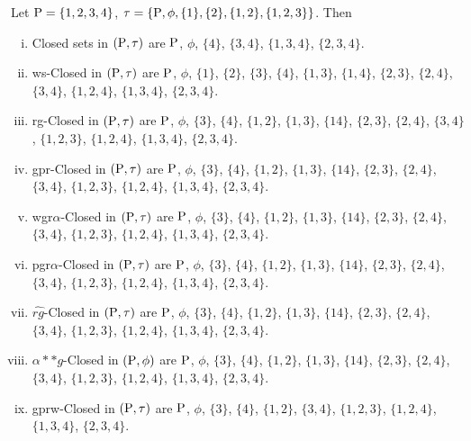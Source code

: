 \begin{exm}\label{exm2.1.7}
Let $\mathrm{P} = \{1, 2, 3, 4\}$, $\tau = \{\mathrm{P},\phi, \{1\}, \{2\}, \{1, 2\}, \{1, 2, 3\}\}$. Then 
\begin{enumerate}[(i)]
\item Closed sets in $(\mathrm{P}, \tau)$ are $\mathrm{P}$, $\phi$, $\{4\}$, $\{3, 4\}$, $\{1, 3, 4\}$, $\{2, 3, 4\}$.

\item ws-Closed in $(\mathrm{P}, \tau)$ are $\mathrm{P}$, $\phi$, $\{1\}$, $\{2\}$, $\{3\}$, $\{4\}$, $\{1, 3\}$, $\{1, 4\}$, $\{2, 3\}$, $\{2, 4\}$, $\{3, 4\}$, $\{1, 2, 4\}$, $\{1, 3, 4\}$, $\{2, 3, 4\}$.

\item rg-Closed in $(\mathrm{P}, \tau)$ are $\mathrm{P}$, $\phi$, $\{3\}$, $\{4\}$, $\{1, 2\}$, $\{1, 3\}$, $\{1 4\}$, $\{2, 3\}$, $\{2, 4\}$, $\{3, 4\}$, $\{1, 2, 3\}$, $\{1, 2, 4\}$, $\{1, 3, 4\}$, $\{2, 3, 4\}$.

\item gpr-Closed in $(\mathrm{P}, \tau)$ are $\mathrm{P}$, $\phi$, $\{3\}$, $\{4\}$, $\{1, 2\}$, $\{1, 3\}$, $\{1 4\}$, $\{2, 3\}$, $\{2, 4\}$, $\{3, 4\}$, $\{1, 2, 3\}$, $\{1, 2, 4\}$, $\{1, 3, 4\}$, $\{2, 3, 4\}$.

\item wgr$\alpha$-Closed in $(\mathrm{P}, \tau)$ are $\mathrm{P}$, $\phi$, $\{3\}$, $\{4\}$, $\{1, 2\}$, $\{1, 3\}$, $\{1 4\}$, $\{2, 3\}$, $\{2, 4\}$, $\{3, 4\}$, $\{1, 2, 3\}$, $\{1, 2, 4\}$, $\{1, 3, 4\}$, $\{2, 3, 4\}$.

\item pgr$\alpha$-Closed in $(\mathrm{P}, \tau)$ are $\mathrm{P}$, $\phi$, $\{3\}$, $\{4\}$, $\{1, 2\}$, $\{1, 3\}$, $\{1 4\}$, $\{2, 3\}$, $\{2, 4\}$, $\{3, 4\}$, $\{1, 2, 3\}$, $\{1, 2, 4\}$, $\{1, 3, 4\}$, $\{2, 3, 4\}$.

\item $\widehat{rg}$-Closed in $(\mathrm{P}, \tau)$ are $\mathrm{P}$, $\phi$, $\{3\}$, $\{4\}$, $\{1, 2\}$, $\{1, 3\}$, $\{1 4\}$, $\{2, 3\}$, $\{2, 4\}$, $\{3, 4\}$, $\{1, 2, 3\}$, $\{1, 2, 4\}$, $\{1, 3, 4\}$, $\{2, 3, 4\}$.

\item $\alpha{*}{*} g$-Closed in $(\mathrm{P}, \phi)$ are $\mathrm{P}$, $\phi$, $\{3\}$, $\{4\}$, $\{1, 2\}$, $\{1, 3\}$, $\{1 4\}$, $\{2, 3\}$, $\{2, 4\}$, $\{3, 4\}$, $\{1, 2,3\}$, $\{1, 2, 4\}$, $\{1, 3, 4\}$, $\{2, 3, 4\}$.

\item gprw-Closed in $(\mathrm{P}, \tau)$ are $\mathrm{P}$, $\phi$, $\{3\}$, $\{4\}$, $\{1, 2\}$, $\{3, 4\}$, $\{1, 2, 3\}$, $\{1, 2, 4\}$, $\{1, 3, 4\}$, $\{2, 3,4\}$.


\end{enumerate}
\end{exm}
